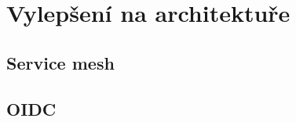 \documentclass[thesis=M,czech]{FITthesis}[2019/12/23]
\theoremstyle{plain}
\theoremstyle{definition}
\begin{document}


\section{Vylepšení na architektuře}



\subsection{Service mesh}


\subsection{OIDC}




\begin{conclusion}
\end{conclusion}




\end{document}
